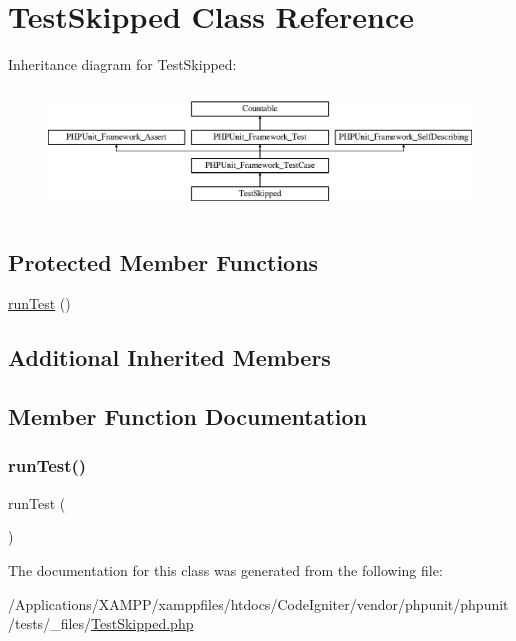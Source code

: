 \hypertarget{class_test_skipped}{}\section{Test\+Skipped Class Reference}
\label{class_test_skipped}
Inheritance diagram for Test\+Skipped\+:\begin{figure}[H]
\begin{center}
\leavevmode
\includegraphics[height=3.303835cm]{class_test_skipped}
\end{center}
\end{figure}
\subsection*{Protected Member Functions}
\begin{DoxyCompactItemize}
\item 
\mbox{\hyperlink{class_test_skipped_ad2541a093be4d619db04ed65d661a684}{run\+Test}} ()
\end{DoxyCompactItemize}
\subsection*{Additional Inherited Members}


\subsection{Member Function Documentation}
\mbox{\label{class_test_skipped_ad2541a093be4d619db04ed65d661a684}} 
\subsubsection{\texorpdfstring{run\+Test()}{runTest()}}
{\footnotesize\ttfamily run\+Test (\begin{DoxyParamCaption}{ }\end{DoxyParamCaption})\hspace{0.3cm}{\ttfamily [protected]}}



The documentation for this class was generated from the following file\+:\begin{DoxyCompactItemize}
\item 
/\+Applications/\+X\+A\+M\+P\+P/xamppfiles/htdocs/\+Code\+Igniter/vendor/phpunit/phpunit/tests/\+\_\+files/\mbox{\hyperlink{_test_skipped_8php}{Test\+Skipped.\+php}}\end{DoxyCompactItemize}
